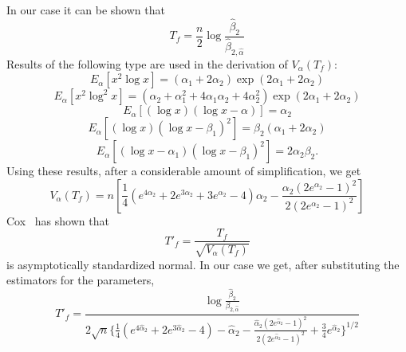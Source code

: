 \documentclass[draft]{article}
\begin{document}
In our case it can be shown that 
\begin{equation}
T_f=\frac{n}{2}\log\frac{\hat{\beta}_2}{\hat{\beta}_{2,\hat{\alpha}}}
\end{equation}
Results of the following type are used in the derivation of 
\(V_\alpha\left(T_f\right)\):
\begin{equation}
E_\alpha\left[x^2\log x\right] = 
\left(\alpha_1+2\alpha_2\right)\exp\left(2\alpha_1+2\alpha_2\right)
\end{equation}
\null\begin{equation}
E_\alpha\left[x^2\log^2x\right] = 
\left(\alpha_2+\alpha_1^2+4\alpha_1\alpha_2+4\alpha_2^2\right)
\exp\left(2\alpha_1+2\alpha_2\right)
\end{equation}
\null\begin{equation}
E_\alpha\left[\left(\log x\right)\left(\log x-\alpha\right)\right] = 
\alpha_2
\end{equation}
\null\begin{equation}
E_\alpha\left[\left(\log x\right)\left(\log x-\beta_1\right)^2\right] =
\beta_2\left(\alpha_1+2\alpha_2\right)
\end{equation}
\null\begin{equation}
E_\alpha\left[\left(\log x -\alpha_1\right)
\left(\log x-\beta_1\right)^2\right] =
2\alpha_2\beta_2.
\end{equation}
Using these results, after a considerable amount of simplification,
we get
\begin{equation}
V_\alpha\left(T_f\right)=n\left[
\frac{1}{4}\left(e^{4\alpha_2}+
2e^{3\alpha_2}+
3e^{\alpha_2}-4\right)
\alpha_2-
\frac{\alpha_2\left(2e^{\alpha_2}-1\right)^2}
     {2\left(2e^{\alpha_2}-1\right)^2}\right]
\end{equation}
Cox~\cite{cox62} has shown that
\begin{equation}
T'_f=\frac{T_f}{\sqrt{V_\alpha\left(T_f\right)}}
\end{equation}
is asymptotically standardized normal. In our case we get,
after substituting the estimators for the parameters,
\begin{equation}
T'_f = \frac{\log\frac{\hat{\beta}_2}{\beta_{2,\hat{\alpha}}}}
{2\sqrt{n}\{\frac{1}{4}\left(e^{4\hat{\alpha}_2}+
2e^{3\hat{\alpha}_2} -4\right) -\hat{\alpha}_2 -
\frac{\hat{\alpha}_2\left(2e^{\hat{\alpha}_2}-1\right)^2}
     {2\left(2e^{\hat{\alpha}_2}-1\right)^2}
+\frac{3}{4}e^{\hat{\alpha}_2}\}^{1/2}}
\end{equation}
\end{document}
